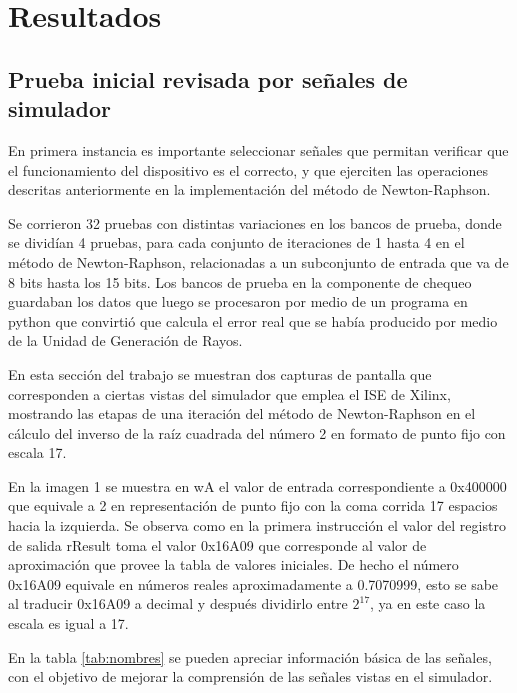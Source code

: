 \chapter{Resultados}

\section{Prueba inicial revisada por señales de simulador}

En primera instancia es importante seleccionar señales que permitan verificar que el funcionamiento del dispositivo es el correcto, y que ejerciten las operaciones descritas anteriormente en la implementación del método de Newton-Raphson.

Se corrieron 32 pruebas con distintas variaciones en los bancos de prueba, donde se dividían 4 pruebas, para cada conjunto de iteraciones de 1 hasta 4 en el método de Newton-Raphson, relacionadas a un subconjunto de entrada que va de 8 bits hasta los 15 bits. Los bancos de prueba en la componente de chequeo guardaban los datos que luego se procesaron por medio de un programa en python que convirtió que calcula el error real que se había producido por medio de la Unidad de Generación de Rayos.

En esta sección del trabajo se muestran dos capturas de pantalla que corresponden a ciertas vistas del simulador que emplea el ISE de Xilinx, mostrando las etapas de una iteración del método de Newton-Raphson en el cálculo del inverso de la raíz cuadrada del número 2 en formato de punto fijo con escala 17.

En la imagen 1 se muestra en wA el valor de entrada correspondiente a 0x400000 que equivale a 2 en representación de punto fijo con la coma corrida 17 espacios hacia la izquierda. Se observa como en la primera instrucción el valor del registro de salida rResult toma el valor 0x16A09 que corresponde al valor de aproximación que provee la tabla de valores iniciales. De hecho el número 0x16A09 equivale en números reales aproximadamente a 0.7070999, esto se sabe al traducir 0x16A09 a decimal y después dividirlo entre $2^{17}$, ya en este caso la escala es igual a 17.  

En la tabla \ref{tab:nombres} se pueden apreciar información básica de las señales, con el objetivo de mejorar la comprensión de las señales vistas en el simulador.

